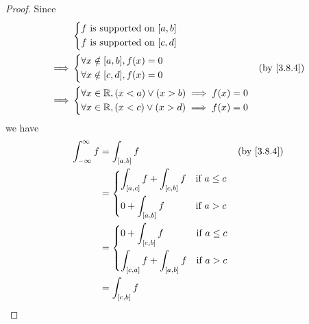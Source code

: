 \begin{proof}
  Since
  \begin{align*}
             & \begin{dcases}
                 f \text{ is supported on } [a, b] \\
                 f \text{ is supported on } [c, d]
               \end{dcases}                        \\
    \implies & \begin{dcases}
                 \forall x \notin [a, b], f(x) = 0 \\
                 \forall x \notin [c, d], f(x) = 0
               \end{dcases}                        &  & \by{3.8.4}      \\
    \implies & \begin{dcases}
                 \forall x \in \R, (x < a) \lor (x > b) \implies f(x) = 0 \\
                 \forall x \in \R, (x < c) \lor (x > d) \implies f(x) = 0
               \end{dcases}
  \end{align*}
  we have
  \begin{align*}
    \int_{-\infty}^\infty f & = \int_{[a, b]} f                                                                                                            &  & \by{3.8.4} \\
                            & = \begin{dcases}
                                  \int_{[a, c]} f + \int_{[c, b]} f & \text{if } a \leq c \\
                                  0 + \int_{[a, b]} f               & \text{if } a > c
                                \end{dcases}                  \\
                            & = \begin{dcases}
                                  0 + \int_{[c, b]} f               & \text{if } a \leq c \\
                                  \int_{[c, a]} f + \int_{[a, b]} f & \text{if } a > c
                                \end{dcases}                  \\
                            & = \int_{[c, b]} f                                                                                                                            \\

\end{align*}
\end{proof}
